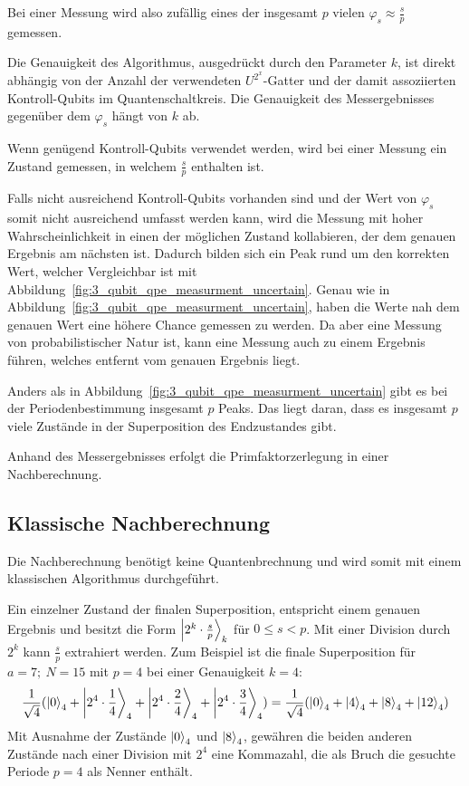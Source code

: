 Bei einer Messung wird also zufällig eines der insgesamt \(p\) vielen \(\varphi_s \approx \frac{s}{p}\) gemessen.

Die Genauigkeit des Algorithmus, ausgedrückt durch den Parameter \(k\),
ist direkt abhängig von der Anzahl der verwendeten \(U^{2^x}\)-Gatter
und der damit assoziierten Kontroll-Qubits im Quantenschaltkreis.
Die Genauigkeit des Messergebnisses gegenüber dem \(\varphi_s\) hängt von \(k\) ab.

Wenn genügend Kontroll-Qubits verwendet werden, 
wird bei einer Messung ein Zustand gemessen, 
in welchem \(\frac{s}{p}\) enthalten ist.

Falls nicht ausreichend Kontroll-Qubits vorhanden sind 
und der Wert von \(\varphi_s\) somit nicht ausreichend umfasst werden kann,
wird die Messung mit hoher Wahrscheinlichkeit 
in einen der möglichen Zustand kollabieren, 
der dem genauen Ergebnis am nächsten ist. 
Dadurch bilden sich ein Peak rund um den korrekten Wert, 
welcher Vergleichbar ist mit Abbildung~\ref{fig:3_qubit_qpe_measurment_uncertain}.
Genau wie in Abbildung~\ref{fig:3_qubit_qpe_measurment_uncertain}, haben die Werte nah dem genauen Wert
eine höhere Chance gemessen zu werden. 
Da aber eine Messung von probabilistischer Natur ist, 
kann eine Messung auch zu einem Ergebnis führen, 
welches entfernt vom genauen Ergebnis liegt.

Anders als in Abbildung~\ref{fig:3_qubit_qpe_measurment_uncertain} gibt es bei der Periodenbestimmung insgesamt \(p\) Peaks.
Das liegt daran, dass es insgesamt \(p\) viele Zustände in der Superposition des Endzustandes gibt.

Anhand des Messergebnisses erfolgt die Primfaktorzerlegung in einer Nachberechnung.

\subsection{Klassische Nachberechnung} \label{Funktionsweise:klassisch}
Die Nachberechnung benötigt keine Quantenbrechnung und 
wird somit mit einem klassischen Algorithmus durchgeführt.

Ein einzelner Zustand der finalen Superposition, 
entspricht einem genauen Ergebnis und besitzt die Form \(\ket{2^k \cdot \frac{s}{p}}_k\) für \(0 \leq s < p\).
Mit einer Division durch \(2^k\) kann \(\frac{s}{p}\) extrahiert werden.
Zum Beispiel ist die finale Superposition für \(a = 7;~N=15\) mit \(p=4\) bei einer Genauigkeit \(k=4\):
\[\frac{1}{\sqrt{4}}(\ket{0}_4 +\ket{2^4 \cdot \frac{1}{4}}_4 + \ket{2^4 \cdot \frac{2}{4}}_4+\ket{2^4 \cdot \frac{3}{4}}_4) =
 \frac{1}{\sqrt{4}}(\ket{0}_4 +\ket{4}_4 + \ket{8}_4+\ket{12}_4) \]
Mit Ausnahme der Zustände \(\ket{0}_4\) und \(\ket{8}_4\), 
gewähren die beiden anderen Zustände nach einer Division mit \(2^4\) eine Kommazahl, 
die als Bruch die gesuchte Periode \(p=4\) als Nenner enthält.

